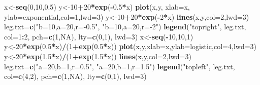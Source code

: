 \documentclass[
]{book}
\newenvironment{Shaded}{\begin{snugshade}}{\end{snugshade}}
\newcommand{\DataTypeTok}[1]{\textcolor[rgb]{0.13,0.29,0.53}{#1}}
\newcommand{\DecValTok}[1]{\textcolor[rgb]{0.00,0.00,0.81}{#1}}
\newcommand{\FloatTok}[1]{\textcolor[rgb]{0.00,0.00,0.81}{#1}}
\newcommand{\KeywordTok}[1]{\textcolor[rgb]{0.13,0.29,0.53}{\textbf{#1}}}
\newcommand{\NormalTok}[1]{#1}
\newcommand{\OperatorTok}[1]{\textcolor[rgb]{0.81,0.36,0.00}{\textbf{#1}}}
\newcommand{\OtherTok}[1]{\textcolor[rgb]{0.56,0.35,0.01}{#1}}
\newcommand{\StringTok}[1]{\textcolor[rgb]{0.31,0.60,0.02}{#1}}
\begin{document}
\begin{Shaded}
\begin{Highlighting}[]
\NormalTok{x\textless{}{-}}\KeywordTok{seq}\NormalTok{(}\DecValTok{0}\NormalTok{,}\DecValTok{10}\NormalTok{,}\FloatTok{0.5}\NormalTok{)}
\NormalTok{y\textless{}{-}}\DecValTok{10}\OperatorTok{+}\DecValTok{20}\OperatorTok{*}\KeywordTok{exp}\NormalTok{(}\OperatorTok{{-}}\FloatTok{0.5}\OperatorTok{*}\NormalTok{x)}
\KeywordTok{plot}\NormalTok{(x,y, }\DataTypeTok{xlab=}\StringTok{\textquotesingle{}x\textquotesingle{}}\NormalTok{, }\DataTypeTok{ylab=}\StringTok{\textquotesingle{}exponential\textquotesingle{}}\NormalTok{,}\DataTypeTok{col=}\DecValTok{1}\NormalTok{,}\DataTypeTok{lwd=}\DecValTok{3}\NormalTok{)}
\NormalTok{y\textless{}{-}}\DecValTok{10}\OperatorTok{+}\DecValTok{20}\OperatorTok{*}\KeywordTok{exp}\NormalTok{(}\OperatorTok{{-}}\DecValTok{2}\OperatorTok{*}\NormalTok{x)}
\KeywordTok{lines}\NormalTok{(x,y,}\DataTypeTok{col=}\DecValTok{2}\NormalTok{,}\DataTypeTok{lwd=}\DecValTok{3}\NormalTok{)}
\NormalTok{leg.txt=}\KeywordTok{c}\NormalTok{(}\StringTok{"b=10,a=20,r={-}0.5"}\NormalTok{, }\StringTok{"b=10,a=20,r={-}2"}\NormalTok{)}
\KeywordTok{legend}\NormalTok{(}\StringTok{"topright"}\NormalTok{, leg.txt, }\DataTypeTok{col=}\DecValTok{1}\OperatorTok{:}\DecValTok{2}\NormalTok{, }\DataTypeTok{pch=}\KeywordTok{c}\NormalTok{(}\DecValTok{1}\NormalTok{,}\OtherTok{NA}\NormalTok{), }\DataTypeTok{lty=}\KeywordTok{c}\NormalTok{(}\DecValTok{0}\NormalTok{,}\DecValTok{1}\NormalTok{), }\DataTypeTok{lwd=}\DecValTok{3}\NormalTok{)}
\NormalTok{x\textless{}{-}}\KeywordTok{seq}\NormalTok{(}\OperatorTok{{-}}\DecValTok{10}\NormalTok{,}\DecValTok{10}\NormalTok{,}\DecValTok{1}\NormalTok{)}
\NormalTok{y\textless{}{-}}\DecValTok{20}\OperatorTok{*}\KeywordTok{exp}\NormalTok{(}\FloatTok{0.5}\OperatorTok{*}\NormalTok{x)}\OperatorTok{/}\NormalTok{(}\DecValTok{1}\OperatorTok{+}\KeywordTok{exp}\NormalTok{(}\FloatTok{0.5}\OperatorTok{*}\NormalTok{x))}
\KeywordTok{plot}\NormalTok{(x,y,}\DataTypeTok{xlab=}\StringTok{\textquotesingle{}x\textquotesingle{}}\NormalTok{,}\DataTypeTok{ylab=}\StringTok{\textquotesingle{}logistic\textquotesingle{}}\NormalTok{,}\DataTypeTok{col=}\DecValTok{4}\NormalTok{,}\DataTypeTok{lwd=}\DecValTok{3}\NormalTok{)}
\NormalTok{y\textless{}{-}}\DecValTok{20}\OperatorTok{*}\KeywordTok{exp}\NormalTok{(}\FloatTok{1.5}\OperatorTok{*}\NormalTok{x)}\OperatorTok{/}\NormalTok{(}\DecValTok{1}\OperatorTok{+}\KeywordTok{exp}\NormalTok{(}\FloatTok{1.5}\OperatorTok{*}\NormalTok{x))}
\KeywordTok{lines}\NormalTok{(x,y,}\DataTypeTok{col=}\DecValTok{2}\NormalTok{,}\DataTypeTok{lwd=}\DecValTok{3}\NormalTok{)}
\NormalTok{leg.txt=}\KeywordTok{c}\NormalTok{(}\StringTok{"a=20,b=1,r=0.5"}\NormalTok{, }\StringTok{"a=20,b=1,r=1.5"}\NormalTok{)}
\KeywordTok{legend}\NormalTok{(}\StringTok{"topleft"}\NormalTok{, leg.txt, }\DataTypeTok{col=}\KeywordTok{c}\NormalTok{(}\DecValTok{4}\NormalTok{,}\DecValTok{2}\NormalTok{), }\DataTypeTok{pch=}\KeywordTok{c}\NormalTok{(}\DecValTok{1}\NormalTok{,}\OtherTok{NA}\NormalTok{), }\DataTypeTok{lty=}\KeywordTok{c}\NormalTok{(}\DecValTok{0}\NormalTok{,}\DecValTok{1}\NormalTok{), }\DataTypeTok{lwd=}\DecValTok{3}\NormalTok{)}
\end{Highlighting}
\end{Shaded}
\end{document}
